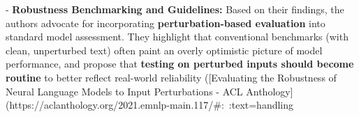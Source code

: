 - \textbf{Robustness Benchmarking and Guidelines:} Based on their findings, the authors advocate for incorporating \textbf{perturbation-based evaluation} into standard model assessment. They highlight that conventional benchmarks (with clean, unperturbed text) often paint an overly optimistic picture of model performance, and propose that \textbf{testing on perturbed inputs should become routine} to better reflect real-world reliability ([Evaluating the Robustness of Neural Language Models to Input Perturbations - ACL Anthology](https://aclanthology.org/2021.emnlp-main.117/#:~:text=handling%

